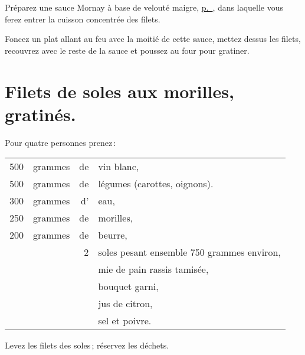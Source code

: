 Préparez une sauce Mornay à base de velouté maigre,
\hyperlink{p0269}{p. \pageref{pg0269}}, dans laquelle vous ferez entrer la cuisson
concentrée des filets.

Foncez un plat allant au feu avec la moitié de cette sauce, mettez dessus les
filets, recouvrez avec le reste de la sauce et poussez au four pour gratiner.

\section*{\centering Filets de soles aux morilles, gratinés.}

Pour quatre personnes prenez :

\medskip

\footnotesize
\begin{longtable}{rrrp{16em}}
    500 & grammes & de & vin blanc,                                                                       \\
    500 & grammes & de & légumes (carottes, oignons).                                                     \\
    300 & grammes & d' & eau,                                                                             \\
    250 & grammes & de & morilles,                                                                        \\
    200 & grammes & de & beurre,                                                                          \\
        &         &  2 & soles pesant ensemble 750 grammes environ,                                       \\
        &         &    & mie de pain rassis tamisée,                                                      \\
        &         &    & bouquet garni,                                                                   \\
        &         &    & jus de citron,                                                                   \\
        &         &    & sel et poivre.                                                                   \\
\end{longtable}
\normalsize

Levez les filets des soles ; réservez les déchets.

